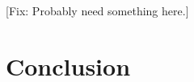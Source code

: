 \begin{description}
% 
% 
% 
% 
% 
% 
% 
% 

\end{description}

[Fix: Probably need something here.]




\section{Conclusion}\label{sec:discussion}


